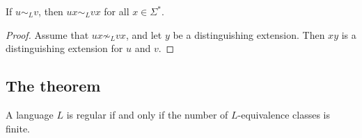 \begin{page}
\setcounter{section}{4}
\setcounter{subsection}{1}
\setcounter{dfn}{6}
\label{portion:1059}

\begin{lem}
\label{lem:LEquivRInvar}
If $u \sim_L v$, then $ux \sim_L vx$ for all $x \in \Sigma^*$.
\end{lem}

\end{page}

\begin{page}
\setcounter{section}{4}
\setcounter{subsection}{2}
\setcounter{dfn}{6}
\label{portion:1060}

\begin{proof}
Assume that $ux \not\sim_L vx$, and let $y$ be a distinguishing extension.
Then $xy$ is a distinguishing extension for $u$ and $v$.
\end{proof}




\end{page}

\begin{page}
\setcounter{section}{4}
\setcounter{subsection}{2}
\setcounter{dfn}{6}
\label{portion:1061}

\subsection{The theorem}

\end{page}

\begin{page}
\setcounter{section}{4}
\setcounter{subsection}{2}
\setcounter{dfn}{7}
\label{portion:1063}

\begin{thm}
A language $L$ is regular if and only if the number of $L$-equivalence classes is finite.
\end{thm}

\end{page}

